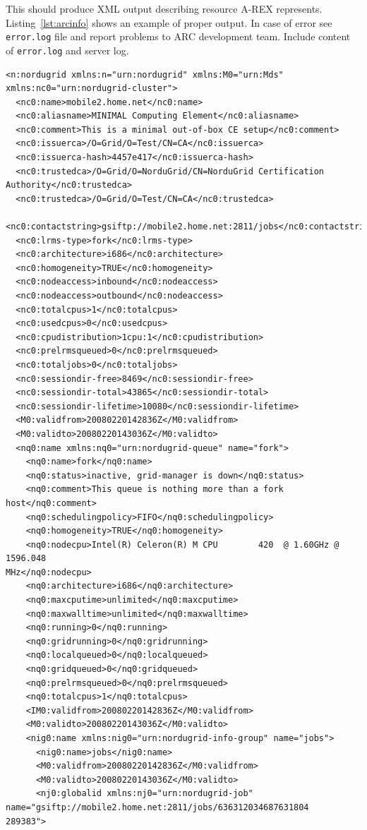 \documentclass{article}                            %
\begin{document}
This should produce XML output describing resource A-REX represents.
Listing~\ref{lst:arcinfo} shows an example of proper output. In case of error see
\texttt{error.log} file and report problems to ARC development team. Include
content of \texttt{error.log} and server log.

\begin{lstlisting}[caption={Example of a good arcinfo output},label=lst:arcinfo]
<n:nordugrid xmlns:n="urn:nordugrid" xmlns:M0="urn:Mds"
xmlns:nc0="urn:nordugrid-cluster">
  <nc0:name>mobile2.home.net</nc0:name>
  <nc0:aliasname>MINIMAL Computing Element</nc0:aliasname>
  <nc0:comment>This is a minimal out-of-box CE setup</nc0:comment>
  <nc0:issuerca>/O=Grid/O=Test/CN=CA</nc0:issuerca>
  <nc0:issuerca-hash>4457e417</nc0:issuerca-hash>
  <nc0:trustedca>/O=Grid/O=NorduGrid/CN=NorduGrid Certification
Authority</nc0:trustedca>
  <nc0:trustedca>/O=Grid/O=Test/CN=CA</nc0:trustedca>
  <nc0:contactstring>gsiftp://mobile2.home.net:2811/jobs</nc0:contactstring>
  <nc0:lrms-type>fork</nc0:lrms-type>
  <nc0:architecture>i686</nc0:architecture>
  <nc0:homogeneity>TRUE</nc0:homogeneity>
  <nc0:nodeaccess>inbound</nc0:nodeaccess>
  <nc0:nodeaccess>outbound</nc0:nodeaccess>
  <nc0:totalcpus>1</nc0:totalcpus>
  <nc0:usedcpus>0</nc0:usedcpus>
  <nc0:cpudistribution>1cpu:1</nc0:cpudistribution>
  <nc0:prelrmsqueued>0</nc0:prelrmsqueued>
  <nc0:totaljobs>0</nc0:totaljobs>
  <nc0:sessiondir-free>8469</nc0:sessiondir-free>
  <nc0:sessiondir-total>43865</nc0:sessiondir-total>
  <nc0:sessiondir-lifetime>10080</nc0:sessiondir-lifetime>
  <M0:validfrom>20080220142836Z</M0:validfrom>
  <M0:validto>20080220143036Z</M0:validto>
  <nq0:name xmlns:nq0="urn:nordugrid-queue" name="fork">
    <nq0:name>fork</nq0:name>
    <nq0:status>inactive, grid-manager is down</nq0:status>
    <nq0:comment>This queue is nothing more than a fork host</nq0:comment>
    <nq0:schedulingpolicy>FIFO</nq0:schedulingpolicy>
    <nq0:homogeneity>TRUE</nq0:homogeneity>
    <nq0:nodecpu>Intel(R) Celeron(R) M CPU        420  @ 1.60GHz @ 1596.048
MHz</nq0:nodecpu>
    <nq0:architecture>i686</nq0:architecture>
    <nq0:maxcputime>unlimited</nq0:maxcputime>
    <nq0:maxwalltime>unlimited</nq0:maxwalltime>
    <nq0:running>0</nq0:running>
    <nq0:gridrunning>0</nq0:gridrunning>
    <nq0:localqueued>0</nq0:localqueued>
    <nq0:gridqueued>0</nq0:gridqueued>
    <nq0:prelrmsqueued>0</nq0:prelrmsqueued>
    <nq0:totalcpus>1</nq0:totalcpus>
    <IM0:validfrom>20080220142836Z</M0:validfrom>
    <M0:validto>20080220143036Z</M0:validto>
    <nig0:name xmlns:nig0="urn:nordugrid-info-group" name="jobs">
      <nig0:name>jobs</nig0:name>
      <M0:validfrom>20080220142836Z</M0:validfrom>
      <M0:validto>20080220143036Z</M0:validto>
      <nj0:globalid xmlns:nj0="urn:nordugrid-job"
name="gsiftp://mobile2.home.net:2811/jobs/636312034687631804
289383">


\end{lstlisting}
\end{document}
